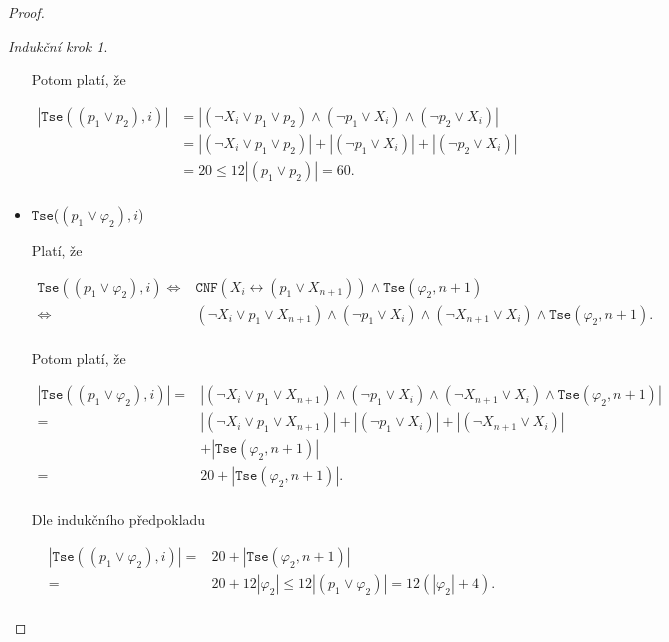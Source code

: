 \documentclass[a4paper, 12pt]{article}
\theoremstyle{definition}
\theoremstyle{definition}
\theoremstyle{definition}
\theoremstyle{remark}
\theoremstyle{remark}
\theoremstyle{remark}
\theoremstyle{remark}
\newtheorem*{inductionstep}{Indukční krok}
\begin{document}
\begin{proof}
\begin{inductionstep}
\begin{itemize}
        \noindent
        Potom platí, že

        \begin{align*}
            |\texttt{Tse}((p_1 \lor p_2), i)| &= |(\neg X_i \lor p_1 \lor p_2) \wedge (\neg p_1 \lor X_i ) \wedge (\neg p_2 \lor X_i)| \\
            &= |(\neg X_i \lor p_1 \lor p_2)| + |(\neg p_1 \lor X_i )| + |(\neg p_2 \lor X_i)| \\
            &= 20 \leq 12 |(p_1 \lor p_2)| = 60.\\
        \end{align*}

        \item $\texttt{Tse}$($(p_1 \lor \varphi_2), i$)

        Platí, že

        \begin{align*}
            \texttt{Tse}((p_1 \lor \varphi_2), i) \Longleftrightarrow &\texttt{CNF}(X_i \leftrightarrow (p_1 \lor X_{n+1})) \wedge \texttt{Tse}(\varphi_2, n + 1) \\
            \Longleftrightarrow &(\neg X_i \lor p_1 \lor X_{n+1}) \wedge (\neg p_1 \lor X_i) \wedge (\neg X_{n+1} \lor X_i) \wedge \texttt{Tse}(\varphi_2, n + 1). \\
        \end{align*}

        

        Potom platí, že

        \begin{align*}
            |\texttt{Tse}((p_1 \lor \varphi_2), i)| = &|(\neg X_i \lor p_1 \lor X_{n+1}) \wedge (\neg p_1 \lor X_i) \wedge (\neg X_{n+1} \lor X_i) \wedge \texttt{Tse}(\varphi_2, n + 1)| \\
            = & |(\neg X_i \lor p_1 \lor X_{n+1})| + |(\neg p_1 \lor X_i)| + |(\neg X_{n+1} \lor X_i)| \\
            &+ |\texttt{Tse}(\varphi_2, n + 1)| \\
            = &20 + |\texttt{Tse}(\varphi_2, n + 1)|. \\
        \end{align*}

        Dle indukčního předpokladu

        \begin{align*}
            |\texttt{Tse}((p_1 \lor \varphi_2), i)| = &20 + |\texttt{Tse}(\varphi_2, n + 1)|\\
            = &20 + 12 |\varphi_2| \leq 12 |(p_1 \lor \varphi_2)| = 12 (|\varphi_2| + 4).\\
        \end{align*}


\end{itemize}
\end{inductionstep}
\end{proof}
\end{document}
